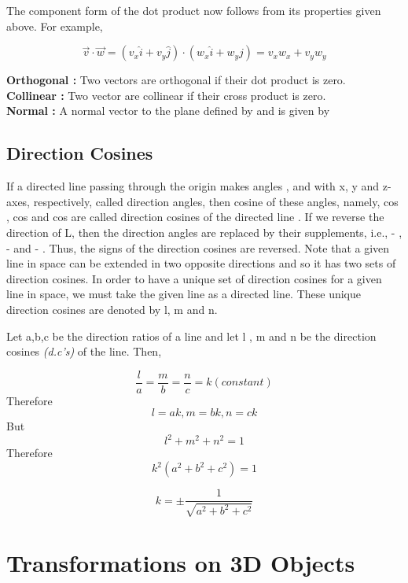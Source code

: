 \documentclass[12pt]{report}
\begin{document}
The component form of the dot product now follows from its properties given above. For example, 

\[ \overrightarrow{v} \cdot \overrightarrow{w} = ( v_{x} \widehat{i} + v_{y} \widehat{j}) \cdot ( w_{x} \widehat{i} + w_{y} \widehat{j}) = v_{x}w_{x} + v_{y}w_{y} \] 

\indent \textbf{Orthogonal : } Two vectors are orthogonal if their dot product is zero.  \\
\indent \textbf{Collinear : } Two vector are collinear if their cross product is zero.  \\
\indent \textbf{Normal : } A normal vector to the plane defined by   and   is given by  \times {}  \\

\subsection{Direction Cosines}


If a directed line  passing through the origin makes angles \alpha, \beta and \gamma with x, y and z-axes, respectively, called direction angles, then cosine of these angles, namely, cos \alpha, cos \beta and cos \gamma are called direction cosines of the directed line  . If we reverse the direction of L, then the direction angles are replaced by their supplements, i.e., \pi - \alpha , \pi - \beta and \pi - \gamma . Thus, the signs of the direction cosines are reversed. 
\vspace{0.3cm}
Note that a given line in space can be extended in two opposite directions and so it has two sets of direction cosines. In order to have a unique set of direction cosines for a given line in space, we must take the given line as a directed line. These unique direction cosines are denoted by l, m and n. \\
\vspace{0.5cm}

Let a,b,c be the direction ratios of a line and let l , m and n be the direction cosines \textit{(d.c's)} of the line. Then,

\[ \dfrac{l}{a} = \dfrac{m}{b} = \dfrac{n}{c} = k (constant) \]
Therefore \[ l = ak, m = bk , n = ck \]
But       \[ l^2 + m^2 + n^2 = 1 \]
Therefore \[ k^2 (a^2 + b^2 + c^2) = 1 \]

\[ k = \pm \dfrac{1}{ \sqrt{a^2 + b^2 + c^2} } \]

\section{Transformations on 3D Objects}
\end{document}
